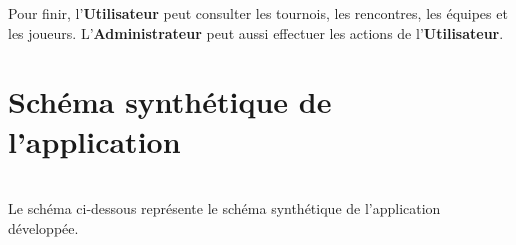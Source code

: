 \documentclass[10pt]{report}
\begin{document}
Pour finir, l'\textbf{Utilisateur} peut consulter les tournois, les rencontres, les équipes et les joueurs.
L'\textbf{Administrateur} peut aussi effectuer les actions de l'\textbf{Utilisateur}.

\newpage
\section{Schéma synthétique de l'application}
~\\
Le schéma ci-dessous représente le schéma synthétique de l'application développée. \\
	\begin{figure}[hp]
	      \begin{center}
	      \end{center}
	\end{figure}
\\
\end{document}
